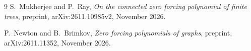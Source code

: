 \documentclass[11pt]{article}
\begin{document}
\begin{thebibliography}{9}
S.~Mukherjee and P.~Ray,
\emph{On the connected zero forcing polynomial of finite trees},
preprint, arXiv:2611.10985v2, November 2026.

P.~Newton and B.~Brimkov,
\emph{Zero forcing polynomials of graphs},
preprint, arXiv:2611.11352, November 2026.
\end{thebibliography}
\end{document}

